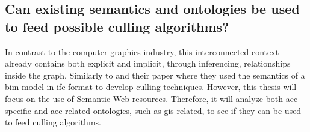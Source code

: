 \subsection[Can existing semantics be used?]{Can existing semantics and ontologies be used\\
	to feed possible culling algorithms?}\label{subsec:rq2}
In contrast to the computer graphics industry, this interconnected context already contains both explicit and implicit, through inferencing, relationships inside the graph. Similarly to \cite{Johansson2009} and their paper where they used the semantics of a \ac{bim} model in \ac{ifc} format to develop culling techniques. However, this thesis will focus on the use of Semantic Web resources. Therefore, it will analyze both \ac{aec}-specific and \ac{aec}-related ontologies, such as \ac{gis}-related, to see if they can be used to feed culling algorithms.